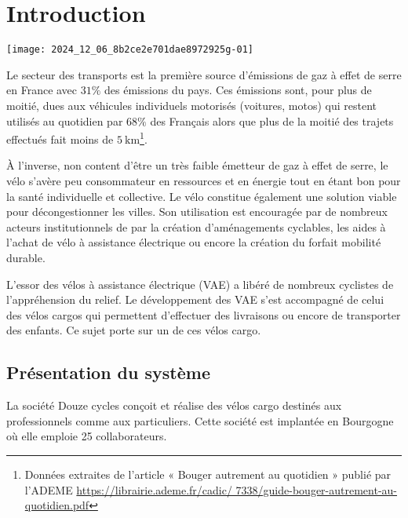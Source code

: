 \section{Introduction}
\ifprof
\else
\begin{center}
\texttt{[image: 2024\_12\_06\_8b2ce2e701dae8972925g-01]}
\end{center}


Le secteur des transports est la première source d'émissions de gaz à effet de serre en France avec \(31 \%\) des émissions du pays. Ces émissions sont, pour plus de moitié, dues aux véhicules individuels motorisés (voitures, motos) qui restent utilisés au quotidien par \(68 \%\) des Français alors que plus de la moitié des trajets effectués fait moins de \(5 \mathrm{~km}\)\footnote{Données extraites de l’article « Bouger autrement au quotidien » publié par l’ADEME  \url{https://librairie.ademe.fr/cadic/
7338/guide-bouger-autrement-au-quotidien.pdf}}.

À l'inverse, non content d'être un très faible émetteur de gaz à effet de serre, le vélo s'avère peu consommateur en ressources et en énergie tout en étant bon pour la santé individuelle et collective. Le vélo constitue également une solution viable pour décongestionner les villes. Son utilisation est encouragée par de nombreux acteurs institutionnels de par la création d'aménagements cyclables, les aides à l'achat de vélo à assistance électrique ou encore la création du forfait mobilité durable.

L'essor des vélos à assistance électrique (VAE) a libéré de nombreux cyclistes de l'appréhension du relief. Le développement des VAE s'est accompagné de celui des vélos cargos qui permettent d'effectuer des livraisons ou encore de transporter des enfants. Ce sujet porte sur un de ces vélos cargo.

\fi

\subsection{Présentation du système}

\ifprof
\else

La société Douze cycles conçoit et réalise des vélos cargo destinés aux professionnels comme aux particuliers. Cette société est implantée en Bourgogne où elle emploie 25 collaborateurs.


